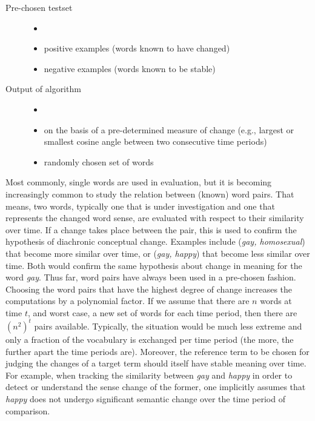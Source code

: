 \documentclass[output=paper]{langsci/langscibook}
\begin{document}
	\begin{description}
		\item[Pre-chosen testset]
		\begin{itemize}
            \item[]
			\item positive examples (words known to have changed)
			\item negative examples (words known to be stable)
		\end{itemize}
	\item[Output of algorithm]
		\begin{itemize}
            \item[]
			\item on the basis of a pre-determined measure of change (e.g., largest or smallest cosine angle between two consecutive time periods)
			\item randomly chosen set of words
		\end{itemize}
	\end{description}
	
		Most commonly, single words are used in evaluation, but it is becoming increasingly common to study the relation between (known) word pairs. That means, two words, typically one that is under investigation and one that represents the changed word sense, are evaluated with respect to their similarity over time. If a change takes place between the pair, this is used to confirm the hypothesis of diachronic conceptual change. Examples include (\emph{gay, homosexual}) that become more similar over time, or (\emph{gay, happy}) that become less similar over time. Both would confirm the same hypothesis about change in meaning for the word \emph{gay}. 
	Thus far, word pairs have always been used in a pre-chosen fashion. Choosing the word pairs that have the highest degree of change increases the computations by a polynomial factor. If we assume that there are $n$ words at time $t$, and worst case, a new set of words for each time period, then there are $(n^2)^t$ pairs available. Typically, the situation would be much less extreme and only a fraction of the vocabulary is exchanged per time period (the more, the further apart the time periods are).  Moreover, the reference term to be chosen for judging the changes of a target term should itself have stable meaning over time. For example, when tracking the similarity between \emph{gay} and \emph{happy} in order to detect or understand the sense change of the former, one implicitly assumes that \emph{happy} does not undergo significant semantic change over the time period of comparison.
	
\end{document}
